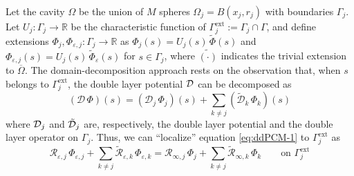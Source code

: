 Let the cavity $\Omega$ be the union of $M$ spheres $\Omega_j = B(x_j, r_j)$ with boundaries $\Gamma_j$. Let $U_j: \Gamma_j \to \mathbb{R}$ be the characteristic function of $\Gamma_j^\text{ext}:= \Gamma_j \cap \Gamma$, and define extensions $\Phi_j , \Phi_{\varepsilon,j} : \Gamma_j \to \mathbb{R}$ as  $\Phi_j (s)= U_j(s) \, \widetilde{\Phi}(s)$ and $\Phi_{\varepsilon,j}(s)= U_j(s) \, \widetilde{\Phi}_{\varepsilon}(s)$ for $s \in \Gamma_j$, where $\tilde{(\cdot)}$ indicates the trivial extension to $\overline{\Omega}$.
The domain-decomposition approach rests on the observation that, when $s$ belongs to $\Gamma_j^\text{ext}$, the double layer potential $\mathcal{D}$ can be decomposed as
\[
(\mathcal{D} \, \Phi ) (s) = ( \mathcal{D}_j \, \Phi_j )(s) + \sum_{k \ne j} (\tilde{\mathcal{D}}_k \, \Phi_k )(s) 
\]
where $\mathcal{D}_j$ and $\tilde{\mathcal{D}}_j$ are, respectively, the double layer potential and the double layer operator on $\Gamma_j$. Thus, we can ``localize'' equation \eqref{eq:ddPCM-1} to $\Gamma_j^\text{ext}$ as
\begin{equation}\label{eq:PCMloc}
{\mathcal{R}}_{\varepsilon,j} \, \Phi_{\varepsilon,j} + \sum_{k \ne j} \tilde{\mathcal{R}}_{\varepsilon,k} \, \Phi_{\varepsilon,k} = {\mathcal{R}}_{\infty,j} \, \Phi_{j} + \sum_{k \ne j} \tilde{\mathcal{R}}_{\infty,k} \, \Phi_{k} \qquad \text{on }\Gamma_j^\text{ext}
\end{equation}
